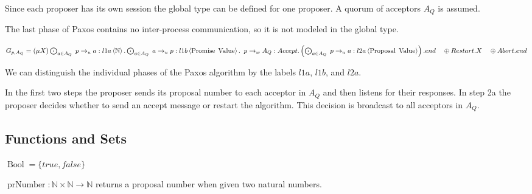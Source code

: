\newcommand{\Mu}[1]{\left(\mu #1\right)}

\newcommand{\Paren}[1]{\left(#1\right)}

Since each proposer has its own session the global type can be defined for one proposer.
A quorum of acceptors $A_Q$ is assumed.

The last phase of Paxos contains no inter-process communication, so it is not modeled in the global type.

$G_{p, A_Q} = \Mu{X} \DotForall{a \in A_Q} \SendUnreliableG{p}{a}{l1a}{\mathbb{N}} . \DotForall{a \in A_Q} \SendUnreliableG{a}{p}{l1b}{\Promise{\Value}} .\\
\hspace*{0.5em}\SendWeaklyG{p}{A_Q}{\Accept.\Paren{\DotForall{a \in A_Q} \SendUnreliableG{p}{a}{l2a}{\Proposal{\Value}}}.end\\
\hspace*{1em}\oplus \Restart.X\\
\hspace*{1em}\oplus \Abort.end}$

We can distinguish the individual phases of the Paxos algorithm by the labels $l1a$, $l1b$, and $l2a$.

In the first two steps the proposer sends its proposal number to each acceptor in $A_Q$ and then listens for their responses.
In step 2a the proposer decides whether to send an accept message or restart the algorithm.
This decision is broadcast to all acceptors in $A_Q$.

\subsection{Functions and Sets}
\newcommand{\Bool}[0]{\operatorname{Bool}}
\newcommand{\prNumber}[2]{\operatorname{prNumber}\left( #1, #2 \right)}
\newcommand{\promValue}[1]{\operatorname{promValue}\left(#1\right)}
\newcommand{\anyNack}[1]{\operatorname{anyNack}\left(#1\right)}
\newcommand{\promCount}[1]{\operatorname{promCount}\left(#1\right)}
\newcommand{\greaterThan}[2]{\operatorname{gt}\left(#1, #2\right)}
\newcommand{\greaterEqual}[2]{\operatorname{ge}\left(#1, #2\right)}
\newcommand{\nFromPr}[1]{\operatorname{nFromPr}\left(#1 \right)}
\newcommand{\genAq}[3]{\operatorname{genA_Q}\left(#1, #2, #3\right)}

$\Bool = \{ true, false \}$

$\operatorname{prNumber} : \mathbb{N} \times \mathbb{N} \to \mathbb{N}$ returns a proposal number when given two natural numbers.

